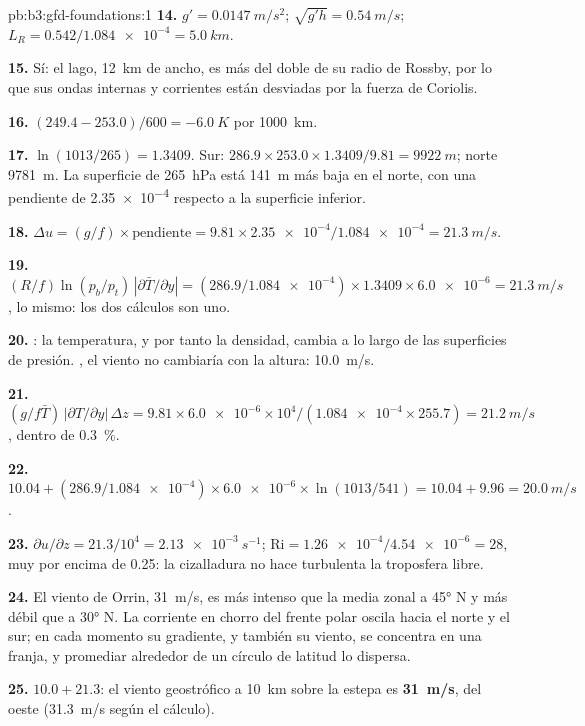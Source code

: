 \begin{solution}{pb:b3:gfd-foundations:1}
\textbf{14.} $g' = \qty{0.0147}{m/s^2}$; $\sqrt{g'h} = \qty{0.54}{m/s}$;
$L_R = 0.542/\num{1.084e-4} = \qty{5.0}{km}$.

\textbf{15.} Sí: el lago, \qty{12}{km} de ancho, es más del doble de su
radio de Rossby, por lo que sus ondas internas y corrientes están desviadas por la
fuerza de Coriolis.

\textbf{16.} $(249.4 - 253.0)/600 = \qty{-6.0}{K}$ por \qty{1000}{km}.

\textbf{17.} $\ln(1013/265) = 1.3409$. Sur:
$286.9\times253.0\times1.3409/9.81 = \qty{9922}{m}$; norte \qty{9781}{m}.
La superficie de \qty{265}{hPa} está \qty{141}{m} más baja en el norte, con una pendiente de
\num{2.35e-4} respecto a la superficie inferior.

\textbf{18.} $\Delta u = (g/f)\times\text{pendiente} = 9.81\times\num{2.35e-4}/
\num{1.084e-4} = \qty{21.3}{m/s}$.

\textbf{19.} $(R/f)\ln(p_b/p_t)\,|\partial\bar T/\partial y| =
(286.9/\num{1.084e-4})\times1.3409\times\num{6.0e-6} = \qty{21.3}{m/s}$, lo
mismo: los dos cálculos son uno.

\textbf{20.} : la temperatura, y por tanto la densidad, cambia a lo largo de
las superficies de presión. , el viento no cambiaría con la altura:
\qty{10.0}{m/s}.

\textbf{21.} $(g/f\bar T)\,|\partial T/\partial y|\,\Delta z = 9.81\times
\num{6.0e-6}\times10^4/(\num{1.084e-4}\times255.7) = \qty{21.2}{m/s}$,
dentro de \qty{0.3}{\percent}.

\textbf{22.} $10.04 + (286.9/\num{1.084e-4})\times\num{6.0e-6}\times
\ln(1013/541) = 10.04 + 9.96 = \qty{20.0}{m/s}$.

\textbf{23.} $\partial u/\partial z = 21.3/10^4 = \qty{2.13e-3}{s^{-1}}$;
$\mathrm{Ri} = \num{1.26e-4}/\num{4.54e-6} = 28$, muy por encima de 0.25: la cizalladura
no hace turbulenta la troposfera libre.

\textbf{24.} El viento de Orrin, \qty{31}{m/s}, es más intenso que la media zonal
a \ang{45} N y más débil que a \ang{30} N. La corriente en chorro del frente polar oscila
hacia el norte y el sur; en cada momento su gradiente, y también su viento, se concentra
en una franja, y promediar alrededor de un círculo de latitud lo dispersa.

\textbf{25.} $10.0 + 21.3$: el viento geostrófico a \qty{10}{km} sobre la
estepa es \textbf{\qty[text-series-to-math=true]{31}{m/s}}, del oeste
(\qty{31.3}{m/s} según el cálculo).
\end{solution}
